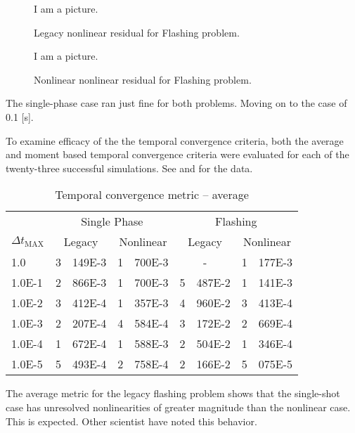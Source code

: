 \begin{figure}[h!t]
\begin{center}
I am a picture.
\end{center}
\caption{Legacy \cobra{} nonlinear residual for Flashing problem.}
\label{fig:legacy_flashing_residual}
\end{figure}

\begin{figure}[h!t]
\begin{center}
I am a picture.
\end{center}
\caption{Nonlinear \cobra{} nonlinear residual for Flashing problem.}
\label{fig:nonlinear_flashing_residual}
\end{figure}

The single-phase case ran just fine for both problems.
Moving on to the case of 0.1 [s].

To examine efficacy of the the temporal convergence criteria, both the average and moment based temporal convergence criteria were evaluated for each of the twenty-three successful simulations.
See  and  for the data.

\begin{table}[h!t]
\centering
\begin{tabular}{@{}l r@{.}l r@{.}l r@{.}l r@{.}l @{}}
\toprule
& \multicolumn{4}{c}{Single Phase} & \multicolumn{4}{c}{Flashing}  \\
$\Delta t_{\text{MAX}}$ & \multicolumn{2}{c}{Legacy} & \multicolumn{2}{c}{Nonlinear} & \multicolumn{2}{c}{Legacy}& \multicolumn{2}{c}{Nonlinear}  \\
\midrule
1.0    & 3&149E-3 & 1&700E-3 & \multicolumn{2}{c}{-} & 1&177E-3 \\
1.0E-1 & 2&866E-3 & 1&700E-3 & 5&487E-2 & 1&141E-3 \\
1.0E-2 & 3&412E-4 & 1&357E-3 & 4&960E-2 & 3&413E-4 \\
1.0E-3 & 2&207E-4 & 4&584E-4 & 3&172E-2 & 2&669E-4 \\
1.0E-4 & 1&672E-4 & 1&588E-3 & 2&504E-2 & 1&346E-4 \\
1.0E-5 & 5&493E-4 & 2&758E-4 & 2&166E-2 & 5&075E-5 \\
\bottomrule  
\end{tabular}
\caption{Temporal convergence metric -- average}
\label{tab:criteria_ave}
\end{table}

The average metric for the legacy flashing problem shows that the single-shot case has unresolved nonlinearities of greater magnitude than the nonlinear case.
This is expected.
Other scientist have noted this behavior.


